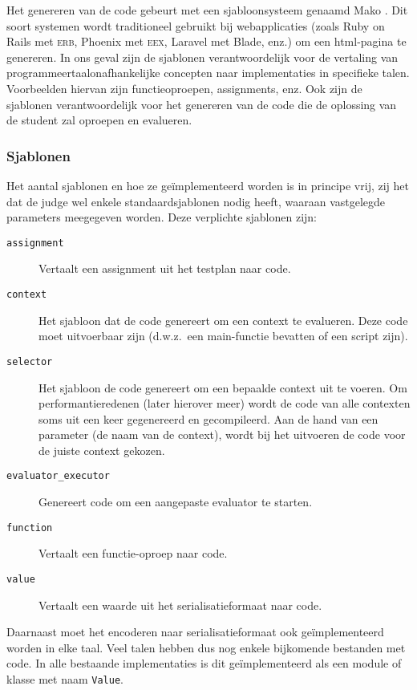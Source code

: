 Het genereren van de code gebeurt met een sjabloonsysteem genaamd Mako \autocite{mako}.
Dit soort systemen wordt traditioneel gebruikt bij webapplicaties (zoals Ruby on Rails met \textsc{erb}, Phoenix met \textsc{eex}, Laravel met Blade, enz.) om een html-pagina te genereren.
In ons geval zijn de sjablonen verantwoordelijk voor de vertaling van programmeertaalonafhankelijke concepten naar implementaties in specifieke talen.
Voorbeelden hiervan zijn functieoproepen, assignments, enz.
Ook zijn de sjablonen verantwoordelijk voor het genereren van de code die de oplossing van de student zal oproepen en evalueren.

\subsubsection{Sjablonen}

Het aantal sjablonen en hoe ze geïmplementeerd worden is in principe vrij, zij het dat de judge wel enkele standaardsjablonen nodig heeft, waaraan vastgelegde parameters meegegeven worden.
Deze verplichte sjablonen zijn:
\begin{description}
    \item[\texttt{assignment}] Vertaalt een assignment uit het testplan naar code.
    \item[\texttt{context}] Het sjabloon dat de code genereert om een context te evalueren.
    Deze code moet uitvoerbaar zijn (d.w.z.\ een main-functie bevatten of een script zijn).
    \item[\texttt{selector}] Het sjabloon de code genereert om een bepaalde context uit te voeren.
    Om performantieredenen (later hierover meer) wordt de code van alle contexten soms uit een keer gegenereerd en gecompileerd.
    Aan de hand van een parameter (de naam van de context), wordt bij het uitvoeren de code voor de juiste context gekozen.
    \item[\texttt{evaluator\_executor}] Genereert code om een aangepaste evaluator te starten.
    \item[\texttt{function}] Vertaalt een functie-oproep naar code.
    \item[\texttt{value}] Vertaalt een waarde uit het serialisatieformaat naar code.
\end{description}

Daarnaast moet het encoderen naar serialisatieformaat ook geïmplementeerd worden in elke taal.
Veel talen hebben dus nog enkele bijkomende bestanden met code.
In alle bestaande implementaties is dit geïmplementeerd als een module of klasse met naam \texttt{Value}.

